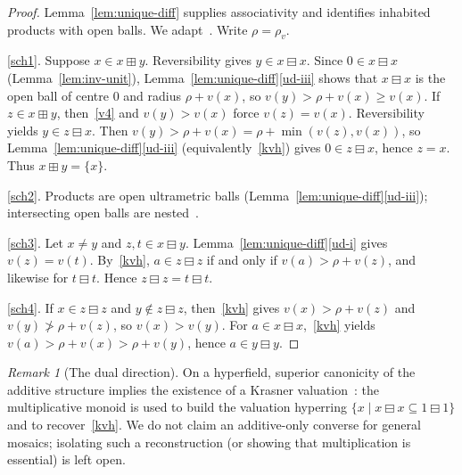 \documentclass[11pt]{amsart}
\theoremstyle{plain}
\theoremstyle{definition}
\theoremstyle{remark}
\newtheorem{remark}[theorem]{Remark}
\begin{document}
\begin{proof}
Lemma~\ref{lem:unique-diff} supplies associativity and identifies inhabited products with open balls.
We adapt~\cite[Proposition~4.19]{Lin23}. Write \(\rho=\rho_v\).

\eqref{sch1}. Suppose \(x\in x\boxplus y\). Reversibility gives \(y\in x\boxminus x\). Since \(0\in x\boxminus x\) (Lemma~\ref{lem:inv-unit}), Lemma~\ref{lem:unique-diff}\eqref{ud-iii} shows that \(x\boxminus x\) is the open ball of centre \(0\) and radius \(\rho+v(x)\), so \(v(y)>\rho+v(x)\ge v(x)\). If \(z\in x\boxplus y\), then~\eqref{v4} and \(v(y)>v(x)\) force \(v(z)=v(x)\). Reversibility yields \(y\in z\boxminus x\). Then \(v(y)>\rho+v(x)=\rho+\min(v(z),v(x))\), so Lemma~\ref{lem:unique-diff}\eqref{ud-iii} (equivalently~\eqref{kvh}) gives \(0\in z\boxminus x\), hence \(z=x\). Thus \(x\boxplus y=\{x\}\).

\eqref{sch2}. Products are open ultrametric balls (Lemma~\ref{lem:unique-diff}\eqref{ud-iii}); intersecting open balls are nested~\cite[Lemma~4.5(iii)]{Lin23}.

\eqref{sch3}. Let \(x\neq y\) and \(z,t\in x\boxminus y\). Lemma~\ref{lem:unique-diff}\eqref{ud-i} gives \(v(z)=v(t)\). By~\eqref{kvh}, \(a\in z\boxminus z\) if and only if \(v(a)>\rho+v(z)\), and likewise for \(t\boxminus t\). Hence \(z\boxminus z=t\boxminus t\).

\eqref{sch4}. If \(x\in z\boxminus z\) and \(y\notin z\boxminus z\), then~\eqref{kvh} gives \(v(x)>\rho+v(z)\) and \(v(y)\not>\rho+v(z)\), so \(v(x)>v(y)\). For \(a\in x\boxminus x\),~\eqref{kvh} yields \(v(a)>\rho+v(x)>\rho+v(y)\), hence \(a\in y\boxminus y\).
\end{proof}

\begin{remark}[The dual direction]
\label{rem:sch-to-kvh}
On a hyperfield, superior canonicity of the additive structure implies the existence of a Krasner valuation~\cite[Proposition~4.20]{Lin23}: the multiplicative monoid is used to build the valuation hyperring \(\{x\mid x\boxminus x\subseteq 1\boxminus 1\}\) and to recover~\eqref{kvh}. We do not claim an additive-only converse for general mosaics; isolating such a reconstruction (or showing that multiplication is essential) is left open.
\end{remark}
\end{document}
